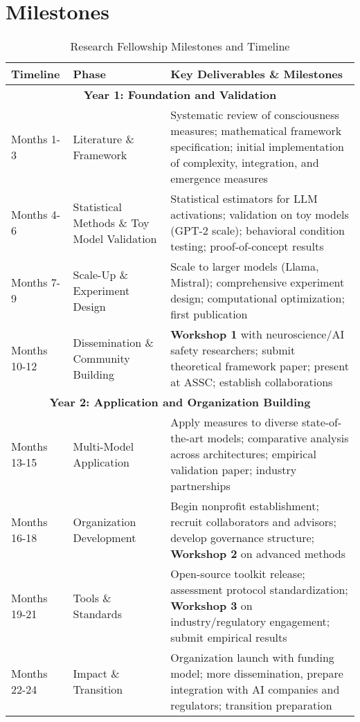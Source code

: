 \documentclass[11pt,a4paper]{article}
\begin{document}
\section{Milestones}
\begin{table}[!htbp]
    \centering
    \small
    \begin{tabular}{|p{2cm}|p{3.5cm}|p{7.5cm}|}
    \hline
    \textbf{Timeline} & \textbf{Phase} & \textbf{Key Deliverables \& Milestones} \\
    \hline
    \multicolumn{3}{|c|}{\textbf{Year 1: Foundation and Validation}} \\
    \hline
    Months 1-3 & Literature \& Framework & 
    Systematic review of consciousness measures; mathematical framework specification; initial implementation of complexity, integration, and emergence measures \\
    \hline
    Months 4-6 & Statistical Methods \& Toy Model Validation & 
    Statistical estimators for LLM activations; validation on toy models (GPT-2 scale); behavioral condition testing; proof-of-concept results \\
    \hline
    Months 7-9 & Scale-Up \& Experiment Design & 
    Scale to larger models (Llama, Mistral); comprehensive experiment design; computational optimization; first publication \\
    \hline
    Months 10-12 & Dissemination \& Community Building & 
    \textbf{Workshop 1} with neuroscience/AI safety researchers; submit theoretical framework paper; present at ASSC; establish collaborations \\
    \hline
    \multicolumn{3}{|c|}{\textbf{Year 2: Application and Organization Building}} \\
    \hline
    Months 13-15 & Multi-Model Application & 
    Apply measures to diverse state-of-the-art models; comparative analysis across architectures; empirical validation paper; industry partnerships \\
    \hline
    Months 16-18 & Organization Development & 
    Begin nonprofit establishment; recruit collaborators and advisors; develop governance structure; \textbf{Workshop 2} on advanced methods \\
    \hline
    Months 19-21 & Tools \& Standards & 
    Open-source toolkit release; assessment protocol standardization; \textbf{Workshop 3} on industry/regulatory engagement; submit empirical results \\
    \hline
    Months 22-24 & Impact \& Transition & 
    Organization launch with funding model; more dissemination, prepare integration with AI companies and regulators; transition preparation \\
    \hline
    \end{tabular}
    \caption{Research Fellowship Milestones and Timeline}
    \label{tab:milestones}
    \end{table}
\end{document}
